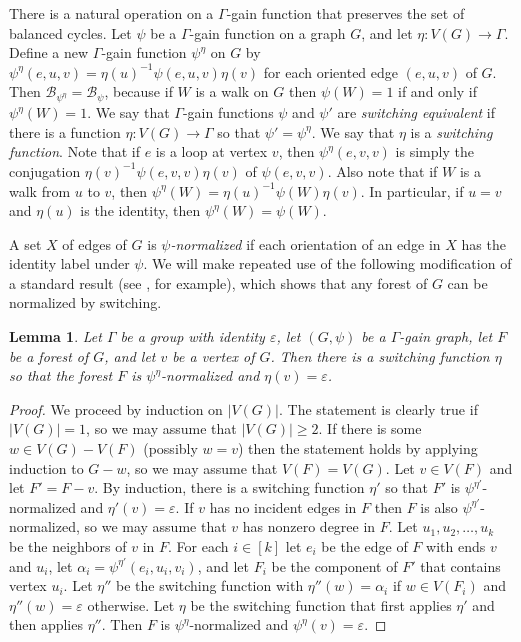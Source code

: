 \documentclass[12pt]{article}
\newtheorem{lemma}[theorem]{Lemma}
\theoremstyle{definition}
\newcommand{\cB}{\mathcal{B}}
\newcommand{\ep}{\varepsilon}
\begin{document}
There is a natural operation on a $\Gamma$-gain function that preserves the set of balanced cycles.
Let $\psi$ be a $\Gamma$-gain function on a graph $G$, and let $\eta \colon V(G) \to \Gamma$.
Define a new $\Gamma$-gain function $\psi^{\eta}$ on $G$ by $\psi^{\eta}(e, u, v) = \eta(u)^{-1} \psi(e, u, v) \eta(v)$ for each oriented edge $(e, u, v)$ of $G$.
Then $\cB_{\psi^{\eta}} = \cB_{\psi}$, because if $W$ is a walk on $G$ then $\psi(W) = 1$ if and only if $\psi^{\eta}(W) = 1$.
We say that $\Gamma$-gain functions $\psi$ and $\psi'$ are \emph{switching equivalent} if there is a function $\eta \colon V(G) \to \Gamma$ so that $\psi' = \psi^{\eta}$.
We say that $\eta$ is a \emph{switching function}.
Note that if $e$ is a loop at vertex $v$, then $\psi^{\eta}(e, v, v)$ is simply the conjugation $\eta(v)^{-1}\psi(e, v, v)\eta(v)$ of $\psi(e, v, v)$.
Also note that if $W$ is a walk from $u$ to $v$, then $\psi^{\eta}(W) = \eta(u)^{-1}\psi(W)\eta(v)$.
In particular, if $u = v$ and $\eta(u)$ is the identity, then $\psi^{\eta}(W) = \psi(W)$.







A set $X$ of edges of $G$ is \emph{$\psi$-normalized} 
if each orientation of an edge in $X$ has the identity label under $\psi$.
We will make repeated use of the following modification of a standard result (see \cite[Proposition 2.1]{Funk-Pivotto-Slilaty-2022}, for example), which shows that any forest of $G$ can be normalized by switching.



\begin{lemma} \label{lem: normalize a forest}
Let $\Gamma$ be a group with identity $\ep$, let $(G, \psi)$ be a $\Gamma$-gain graph, let $F$ be a forest of $G$, and let $v$ be a vertex of $G$.
Then there is a switching function $\eta$ so that the forest $F$ is $\psi^{\eta}$-normalized and $\eta(v) = \ep$.
\end{lemma}
\begin{proof}
We proceed by induction on $|V(G)|$.
The statement is clearly true if $|V(G)| = 1$, so we may assume that $|V(G)| \ge 2$.
If there is some $w \in V(G) - V(F)$ (possibly $w = v$) then the statement holds by applying induction to $G - w$, so we may assume that $V(F) = V(G)$.
Let $v \in V(F)$ and let $F' = F - v$.
By induction, there is a switching function $\eta'$ so that $F'$ is $\psi^{\eta'}$-normalized and $\eta'(v) = \ep$.
If $v$ has no incident edges in $F$ then $F$ is also $\psi^{\eta'}$-normalized, so we may assume that $v$ has nonzero degree in $F$.
Let $u_1, u_2, \dots, u_k$ be the neighbors of $v$ in $F$.
For each $i \in [k]$ let $e_i$ be the edge of $F$ with ends $v$ and $u_i$,  let $\alpha_i = \psi^{\eta'}(e_i, u_i, v_i)$, and let $F_i$ be the component of $F'$ that contains vertex $u_i$. 
Let $\eta''$ be the switching function with $\eta''(w) = \alpha_i$ if $w \in V(F_i)$ and $\eta''(w) = \ep$ otherwise.
Let $\eta$ be the switching function that first applies $\eta'$ and then applies $\eta''$.
Then $F$ is $\psi^{\eta}$-normalized and $\psi^{\eta}(v) = \ep$.
\end{proof}
\end{document}

